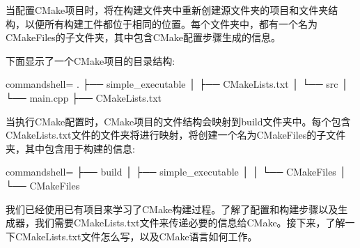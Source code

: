 当配置CMake项目时，将在构建文件夹中重新创建源文件夹的项目和文件夹结构，以便所有构建工件都位于相同的位置。每个文件夹中，都有一个名为CMakeFiles的子文件夹，其中包含CMake配置步骤生成的信息。

下面显示了一个CMake项目的目录结构:

\begin{tcblisting}{commandshell={}}
.
├── simple_executable
│      ├── CMakeLists.txt
│      └── src
│            └── main.cpp
├── CMakeLists.txt
\end{tcblisting}

当执行CMake配置时，CMake项目的文件结构会映射到build文件夹中。每个包含CMakeLists.txt文件的文件夹将进行映射，将创建一个名为CMakeFiles的子文件夹，其中包含用于构建的信息:

\begin{tcblisting}{commandshell={}}
├── build
│     ├── simple_executable
│     │      └── CMakeFiles
│     └── CMakeFiles
\end{tcblisting}

我们已经使用已有项目来学习了CMake构建过程。了解了配置和构建步骤以及生成器，我们需要CMakeLists.txt文件来传递必要的信息给CMake。接下来，了解一下CMakeLists.txt文件怎么写，以及CMake语言如何工作。























